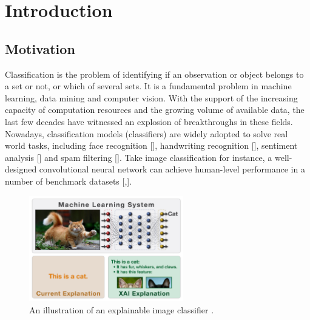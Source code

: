 \chapter{Introduction}\label{sec-introduction}
\section{Motivation}


Classification is the problem of identifying if an observation or object belongs to a set or not, or which of several sets. It is a fundamental problem in machine learning, data mining and computer vision. With the support of the increasing capacity of computation resources and the growing volume of available data, the last few decades have witnessed an explosion of breakthroughs in these fields. Nowadays, classification models (classifiers) are widely adopted to solve real world tasks, including face recognition [], handwriting recognition [], sentiment analysis [] and spam filtering []. Take image classification for instance, a well-designed convolutional neural network can achieve human-level performance in a number of benchmark datasets [,]. 


\begin{figure}[hb]
  \centering
  \includegraphics[width=0.6\textwidth]{figure/explain_cat}
  \caption{An illustration of an explainable image classifier \cite{darpa2017xai}.}
  \label{fig:explain-cat}
\end{figure}


